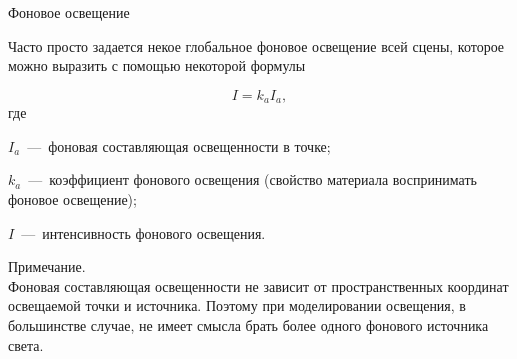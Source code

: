\documentclass{beamer}
\begin{document}
	\begin{frame}{Фоновое освещение}

		Часто просто задается некое глобальное фоновое освещение всей сцены, которое можно выразить с помощью некоторой формулы

		\[
			I = k_a I_a
			,
		\]
		где 
		
		$I_a$~---~фоновая составляющая освещенности в точке;

		$k_a$~---~коэффициент фонового освещения (свойство материала воспринимать фоновое освещение);
		
		$I$~---~интенсивность фонового освещения.
		
		\footnotesize
		Примечание.\\
		Фоновая составляющая освещенности не зависит от пространственных координат освещаемой точки и источника. 
		Поэтому при моделировании освещения, в большинстве случае, не имеет смысла брать более одного фонового источника света. 
		
		
	\end{frame}
\end{document}

